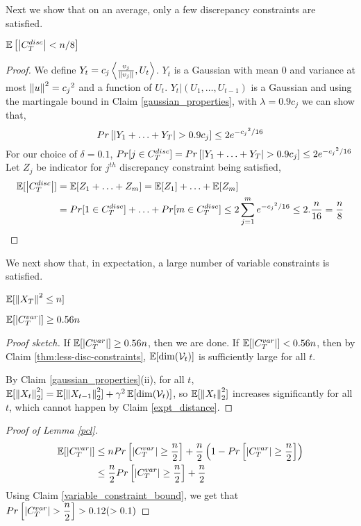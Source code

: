 Next we show that on an average, only a few discrepancy constraints are satisfied.
\begin{Claim}
\label{thm:less-disc-constraints}
$\mathbb{E}\left[\left\lvert C_T^{disc} \right\rvert < n/8 \right]$
\end{Claim}
\begin{proof}
We define $Y_t = c_j\left\langle \frac{v_j}{\left\lVert v_j \right\rVert},U_t\right\rangle$. $Y_t$ is a Gaussian with mean 0 and variance at most $\left\lVert u \right\rVert^2 = {c_j}^2$ and a function of $U_t$.
$Y_t|(U_1,\hdots,U_{t-1})$ is a Gaussian and using the martingale bound in Claim \ref{gaussian_properties},  with $\lambda = 0.9c_j$ we can show that,
\[Pr\left[ \left\lvert Y_1+\hdots+Y_T \right\rvert > 0.9c_j \right] \leq 2e^{{-c_j}^2/16}\]
For our choice of $\delta = 0.1$, $Pr[j \in C_T^{disc}] = Pr\left[ \left\lvert Y_1+\hdots+Y_T \right\rvert > 0.9c_j \right] \leq 2e^{{-c_j}^2/16}$
Let $Z_j$ be indicator for $j^{th}$ discrepancy constraint being satisfied,
\begin{align*}
    \mathbb{E}[\left\lvert C_T^{disc} \right\rvert]
    &= \mathbb{E}[Z_1+\hdots+Z_m]
    = \mathbb{E}[Z_1] + \hdots + \mathbb{E}[Z_m]\\
    &= Pr[1 \in C_T^{disc}] + \hdots + Pr[m \in C_T^{disc}]
    \leq 2\sum_{j=1}^{m}{e^{{-c_j}^2/16}} \leq 2.\dfrac{n}{16} = \dfrac{n}{8}
\end{align*}
\end{proof}

We next show that, in expectation, a large number of variable constraints is satisfied.
\begin{Claim} \label{expt_distance}
$\mathbb{E}[\left\lVert X_T \right\rVert^2 \leq n]$
\end{Claim}
\begin{Claim} \label{variable_constraint_bound}
$\mathbb{E}[\left\lvert C_T^{var} \right\rvert] \geq 0.56n$
\end{Claim}
\begin{proof}[Proof sketch]
If $\operatorname{\mathbb{E}}[\left\lvert C_T^{var} \right\rvert] \ge 0.56n$, then we are done.
If $\operatorname{\mathbb{E}}[\left\lvert C_T^{var} \right\rvert] < 0.56n$, then by Claim \ref{thm:less-disc-constraints},
$\operatorname{\mathbb{E}}[\dim(\mathcal{V}_t)]$ is sufficiently large for all $t$.

By Claim \ref{gaussian_properties}(ii), for all $t$,
$\operatorname{\mathbb{E}}[\left\lVert X_t \right\rVert_2^2] = \operatorname{\mathbb{E}}[\left\lVert X_{t-1} \right\rVert_2^2] + \gamma^2\operatorname{\mathbb{E}}[\dim(\mathcal{V}_t)]$,
so $\operatorname{\mathbb{E}}[\left\lVert X_t \right\rVert_2^2]$ increases significantly for all $t$,
which cannot happen by Claim \ref{expt_distance}.
\end{proof}

\begin{proof}[Proof of Lemma \ref{pcl}]
\begin{align*}
  \mathbb{E}[\left\lvert C_T^{var} \right\rvert]
&\leq nPr\left[\left\lvert C_T^{var} \right\rvert \geq \dfrac{n}{2}\right] + \dfrac{n}{2}\left(1- Pr\left[\left\lvert C_T^{var} \right\rvert \geq \dfrac{n}{2}\right] \right )\\
&\leq \dfrac{n}{2}Pr\left[\left\lvert C_T^{var} \right\rvert \geq \dfrac{n}{2}\right]  + \dfrac{n}{2}
\end{align*}
Using Claim \ref{variable_constraint_bound}, we get that $Pr\left[\left\lvert C_T^{var} \right\rvert > \dfrac{n}{2}\right] > 0.12 (> 0.1)$
\end{proof}

